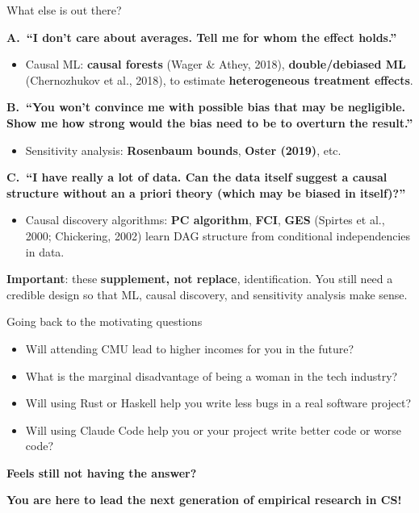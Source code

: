 \documentclass[aspectratio=169, 12pt]{beamer}
\newcommand{\redt}[1]{\textcolor{emphred}{#1}}
\begin{document}
\begin{frame}{What else is out there?}

\textbf{A.\ ``I don't care about averages. Tell me \redt{for whom} the effect holds.''}
\begin{itemize}\setlength\itemsep{0.15em}
  \item Causal ML: \textbf{causal forests} (Wager \& Athey, 2018), \textbf{double/debiased ML} (Chernozhukov et al., 2018), to estimate \textbf{heterogeneous treatment effects}.
\end{itemize}

\vspace{0.3em}
\textbf{B.\ ``You won't convince me with possible bias that may be negligible. Show me \redt{how strong} would the bias need to be to overturn the result.''}
\begin{itemize}\setlength\itemsep{0.15em}
  \item Sensitivity analysis: \textbf{Rosenbaum bounds}, \textbf{Oster (2019)}, etc.
\end{itemize}

\vspace{0.3em}
\textbf{C.\ ``I have really a lot of data. Can the data itself suggest a causal structure \redt{without an a priori theory} (which may be biased in itself)?''}
\begin{itemize}\setlength\itemsep{0.15em}
  \item Causal discovery algorithms: \textbf{PC algorithm}, \textbf{FCI}, \textbf{GES}
    (Spirtes et al., 2000; Chickering, 2002) learn DAG structure from conditional independencies in data.
\end{itemize}

\vspace{0.3em}
\textbf{\redt{Important}}: these \textbf{supplement, not replace}, identification.
You still need a credible design so that ML, causal discovery, and sensitivity analysis \redt{make sense}.
\end{frame}

\begin{frame}{Going back to the motivating questions}
  \begin{itemize}\setlength\itemsep{0.2em}
    \item Will attending CMU lead to higher incomes \redt{for you} in the future?
    \item What is the \redt{marginal disadvantage of being a woman} in the tech industry?
    \item Will using Rust or Haskell \redt{help you write less bugs} in a real software project?
    \item Will using Claude Code \redt{help you or your project} write better code or worse code?
  \end{itemize}

  \vspace{2em}
  \textbf{Feels still not having the answer?}

  \vspace{0.5em}
  \redt{\textbf{You are here to lead the next generation of empirical research in CS!}}
\end{frame}
\end{document}
